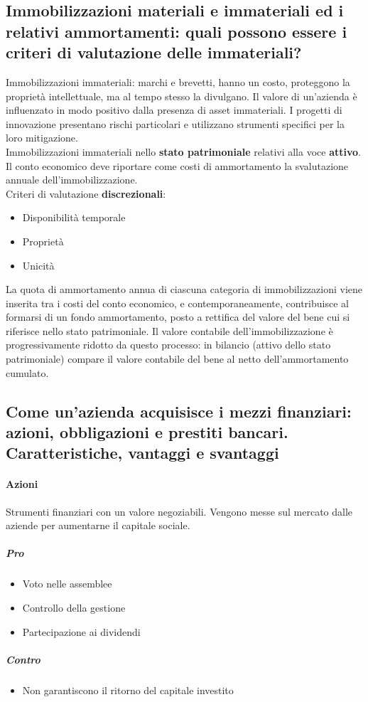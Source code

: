 \documentclass[12pt]{article}
\begin{document}
\subsection{Immobilizzazioni materiali e immateriali ed i relativi ammortamenti: quali possono essere i criteri di valutazione delle immateriali?}
Immobilizzazioni immateriali: marchi e brevetti, hanno un costo, proteggono la proprietà intellettuale, ma al tempo stesso la divulgano. Il valore di un’azienda è influenzato in modo positivo dalla presenza di asset immateriali. I progetti di innovazione presentano rischi particolari e utilizzano strumenti specifici per la loro mitigazione.\\
Immobilizzazioni immateriali nello \textbf{stato patrimoniale} relativi alla voce \textbf{attivo}.
Il conto economico deve riportare come costi di ammortamento la svalutazione annuale dell’immobilizzazione.
\\Criteri di valutazione \textbf{discrezionali}:
\begin{itemize}
    \item Disponibilità temporale
    \item Proprietà
    \item Unicità
\end{itemize}

La quota di ammortamento annua di ciascuna categoria di immobilizzazioni viene inserita tra i costi del conto economico, e contemporaneamente, contribuisce al formarsi di un fondo ammortamento, posto a rettifica del valore del bene cui si riferisce nello stato patrimoniale.
Il valore contabile dell’immobilizzazione è progressivamente ridotto da questo processo: in bilancio (attivo dello stato patrimoniale) compare il valore contabile del bene al netto dell’ammortamento cumulato.

\newpage
\subsection{Come un'azienda acquisisce i mezzi finanziari: azioni, obbligazioni e prestiti bancari. Caratteristiche, vantaggi e svantaggi}
\paragraph{Azioni}
Strumenti finanziari con un valore negoziabili. Vengono messe sul mercato dalle aziende per aumentarne il capitale sociale.
\subparagraph{Pro}
\begin{itemize}
    \item Voto nelle assemblee
    \item Controllo della gestione
    \item Partecipazione ai dividendi
\end{itemize}
\subparagraph{Contro}
\begin{itemize}
    \item Non garantiscono il ritorno del capitale investito
\end{itemize}
\end{document}
